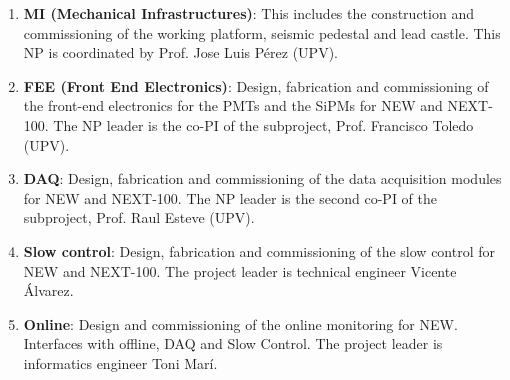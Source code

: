 \begin{enumerate}
\item {\bf MI (Mechanical Infrastructures)}: This includes the construction and commissioning of the working platform, seismic pedestal and lead castle. This NP is coordinated by Prof. Jose Luis P\'erez (UPV). 
\item {\bf FEE (Front End Electronics)}: Design, fabrication and commissioning of the front-end electronics for the PMTs and the SiPMs for NEW and NEXT-100. The NP leader is the co-PI of the subproject, Prof. Francisco Toledo (UPV).
\item {\bf DAQ}: Design, fabrication and commissioning of the data acquisition modules for NEW and NEXT-100. The NP leader is the second co-PI of the subproject, Prof. Raul Esteve (UPV).
\item {\bf Slow control}: Design, fabrication and commissioning of the slow control for NEW and NEXT-100. The project leader is technical engineer Vicente Álvarez.
\item {\bf Online}: Design and commissioning of the online monitoring for NEW. Interfaces with offline, DAQ and Slow Control. The project leader is 
informatics engineer Toni Mar\'i.
\end{enumerate}
%
%
%
